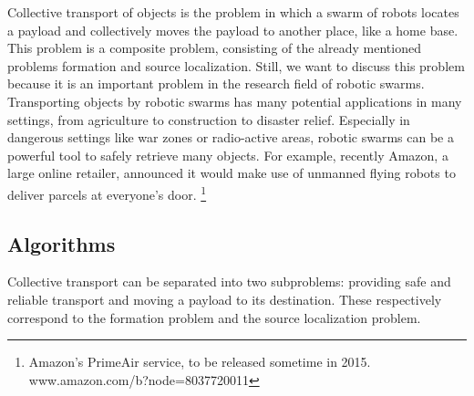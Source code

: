 
Collective transport of objects is the problem in which a swarm of robots locates a payload and collectively moves the payload to another place, like a home base. 
This problem is a composite problem, consisting of the already mentioned problems formation and source localization. 
Still, we want to discuss this problem because it is an important problem in the research field of robotic swarms.
Transporting objects by robotic swarms has many potential applications in many settings, from agriculture to construction to disaster relief. 
Especially in dangerous settings like war zones or radio-active areas, robotic swarms can be a powerful tool to safely retrieve many objects. 
For example, recently Amazon, a large online retailer, announced it would make use of unmanned flying robots to deliver parcels at everyone's door. \footnote{Amazon's PrimeAir service, to be released sometime in 2015. www.amazon.com/b?node=8037720011}

\subsection{Algorithms}

Collective transport can be separated into two subproblems: providing safe and reliable transport and moving a payload to its destination.
These respectively correspond to the formation problem and the source localization problem.


